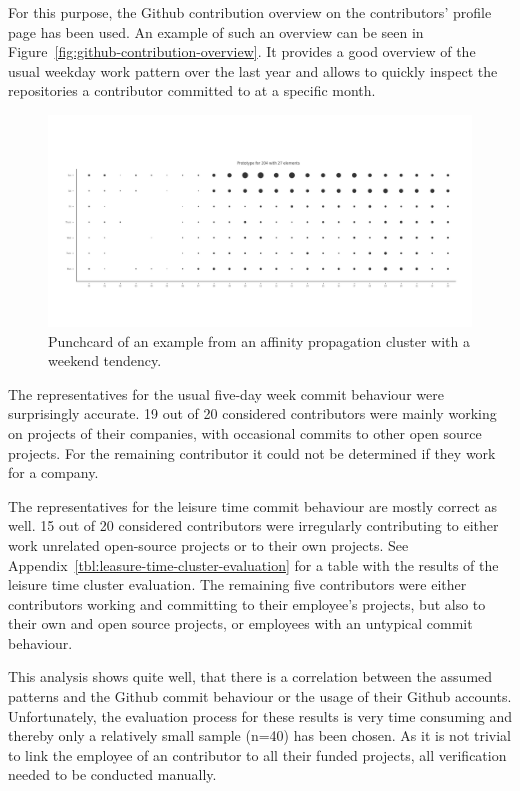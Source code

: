 For this purpose, the Github contribution overview on the contributors' profile page has been used.
An example of such an overview can be seen in Figure~\ref{fig:github-contribution-overview}.
It provides a good overview of the usual weekday work pattern over the last year and allows to quickly inspect the repositories a contributor committed to at a specific month.

\begin{figure}[H]
    \includegraphics[scale=0.32]{./graphs/analysis-affinity/204}
    \centering
    \caption{Punchcard of an example from an affinity propagation cluster with a weekend tendency.}\label{fig:leisure-time-hours}
\end{figure}

The representatives for the usual five-day week commit behaviour were surprisingly accurate.
19 out of 20 considered contributors were mainly working on projects of their companies, with occasional commits to other open source projects.
For the remaining contributor it could not be determined if they work for a company.



The representatives for the leisure time commit behaviour are mostly correct as well.
15 out of 20 considered contributors were irregularly contributing to either work unrelated open-source projects or to their own projects.
See Appendix~\ref{tbl:leasure-time-cluster-evaluation} for a table with the results of the leisure time cluster evaluation.
The remaining five contributors were either contributors working and committing to their employee's projects, but also to their own and open source projects, or employees with an untypical commit behaviour.

This analysis shows quite well, that there is a correlation between the assumed patterns and the Github commit behaviour or the usage of their Github accounts.
Unfortunately, the evaluation process for these results is very time consuming and thereby only a relatively small sample (n=40) has been chosen.
As it is not trivial to link the employee of an contributor to all their funded projects, all verification needed to be conducted manually.


